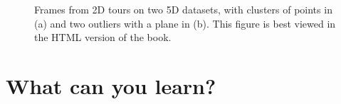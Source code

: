 \documentclass[
  letterpaper,
]{krantz}
\begin{document}
\begin{figure}

\begin{minipage}{0.50\linewidth}



\end{minipage}%
%
\begin{minipage}{0.50\linewidth}



\end{minipage}%

\caption{\label{fig-tour-intro-pdf}Frames from 2D tours on two 5D
datasets, with clusters of points in (a) and two outliers with a plane
in (b). This figure is best viewed in the HTML version of the book.}

\end{figure}%

\section{What can you learn?}\label{what-can-you-learn}
\end{document}
